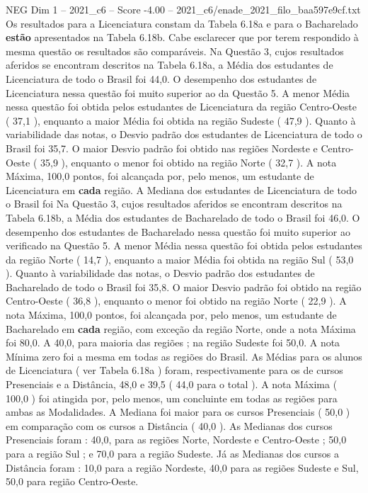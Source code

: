 \begin{textsample}{NEG Dim 1 – 2021\_c6 – Score -4.00 – 2021\_c6/enade\_2021\_filo\_baa597e9cf.txt}
Os resultados para a Licenciatura constam da Tabela 6.18a e para o Bacharelado \textbf{estão} apresentados na Tabela 6.18b.
Cabe esclarecer que por terem respondido à mesma questão os resultados são comparáveis.
Na Questão 3, cujos resultados aferidos se encontram descritos na Tabela 6.18a, a Média dos estudantes de Licenciatura de todo o Brasil foi 44,0.
O desempenho dos estudantes de Licenciatura nessa questão foi muito superior ao da Questão 5.
A menor Média nessa questão foi obtida pelos estudantes de Licenciatura da região Centro-Oeste ( 37,1 ), enquanto a maior Média foi obtida na região Sudeste ( 47,9 ).
Quanto à variabilidade das notas, o Desvio padrão dos estudantes de Licenciatura de todo o Brasil foi 35,7.
O maior Desvio padrão foi obtido nas regiões Nordeste e Centro-Oeste ( 35,9 ), enquanto o menor foi obtido na região Norte ( 32,7 ).
A nota Máxima, 100,0 pontos, foi alcançada por, pelo menos, um estudante de Licenciatura em \textbf{cada} região.
A Mediana dos estudantes de Licenciatura de todo o Brasil foi Na Questão 3, cujos resultados aferidos se encontram descritos na Tabela 6.18b, a Média dos estudantes de Bacharelado de todo o Brasil foi 46,0.
O desempenho dos estudantes de Bacharelado nessa questão foi muito superior ao verificado na Questão 5.
A menor Média nessa questão foi obtida pelos estudantes da região Norte ( 14,7 ), enquanto a maior Média foi obtida na região Sul ( 53,0 ).
Quanto à variabilidade das notas, o Desvio padrão dos estudantes de Bacharelado de todo o Brasil foi 35,8.
O maior Desvio padrão foi obtido na região Centro-Oeste ( 36,8 ), enquanto o menor foi obtido na região Norte ( 22,9 ).
A nota Máxima, 100,0 pontos, foi alcançada por, pelo menos, um estudante de Bacharelado em \textbf{cada} região, com exceção da região Norte, onde a nota Máxima foi 80,0.
A 40,0, para maioria das regiões ; na região Sudeste foi 50,0.
A nota Mínima zero foi a mesma em todas as regiões do Brasil.
As Médias para os alunos de Licenciatura ( ver Tabela 6.18a ) foram, respectivamente para os de cursos Presenciais e a Distância, 48,0 e 39,5 ( 44,0 para o total ).
A nota Máxima ( 100,0 ) foi atingida por, pelo menos, um concluinte em todas as regiões para ambas as Modalidades.
A Mediana foi maior para os cursos Presenciais ( 50,0 ) em comparação com os cursos a Distância ( 40,0 ).
As Medianas dos cursos Presenciais foram : 40,0, para as regiões Norte, Nordeste e Centro-Oeste ; 50,0 para a região Sul ; e 70,0 para a região Sudeste.
Já as Medianas dos cursos a Distância foram : 10,0 para a região Nordeste, 40,0 para as regiões Sudeste e Sul, 50,0 para região Centro-Oeste.

\end{textsample}
